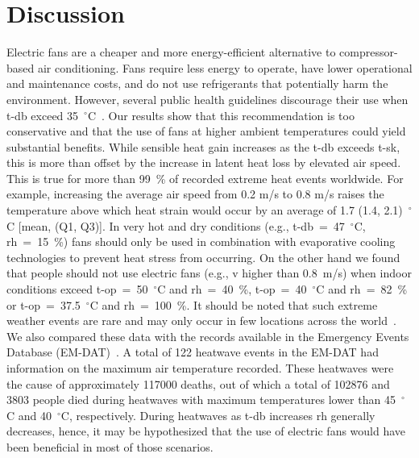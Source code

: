 
\section{Discussion}\label{sec:discussion}

Electric fans are a cheaper and more energy-efficient alternative to compressor-based air conditioning.
Fans require less energy to operate, have lower operational and maintenance costs, and do not use refrigerants that potentially harm the environment.
However, several public health guidelines discourage their use when \acf{t-db} exceed 35~$^{\circ}$C~\cite{WMO2015}.
Our results show that this recommendation is too conservative and that the use of fans at higher ambient temperatures could yield substantial benefits.
While sensible heat gain increases as the \ac{t-db} exceeds \acf{t-sk}, this is more than offset by the increase in latent heat loss by elevated air speed. 
This is true for more than 99~\% of recorded extreme heat events worldwide.
For example, increasing the average air speed from 0.2 m/s to 0.8 m/s raises the temperature above which heat strain would occur by an average of 1.7 (1.4, 2.1)~$^{\circ}$C [mean, (Q1, Q3)].
In very hot and dry conditions (e.g., \ac{t-db}~=~47~$^{\circ}$C, \ac{rh}~=~15~\%) fans should only be used in combination with evaporative cooling technologies to prevent heat stress from occurring.
On the other hand we found that people should not use electric fans (e.g., \ac{v} higher than 0.8~m/s) when indoor conditions exceed \ac{t-op}~=~50~$^{\circ}$C and \ac{rh}~=~40~\%, \ac{t-op}~=~40~$^{\circ}$C and \ac{rh}~=~82~\% or \ac{t-op}~=~37.5~$^{\circ}$C and \ac{rh}~=~100~\%.
It should be noted that such extreme weather events are rare and may only occur in few locations across the world~\cite{ASHRA2017}.
We also compared these data with the records available in the Emergency Events Database (EM-DAT)~\cite{EMDATThe70:online}.
A total of 122 heatwave events in the EM-DAT had information on the maximum air temperature recorded.
These heatwaves were the cause of approximately 117000 deaths, out of which a total of 102876 and 3803 people died during heatwaves with maximum temperatures lower than 45~$^{\circ}$C and 40~$^{\circ}$C, respectively.
During heatwaves as \ac{t-db} increases \ac{rh} generally decreases, hence, it may be hypothesized that the use of electric fans would have been beneficial in most of those scenarios.

